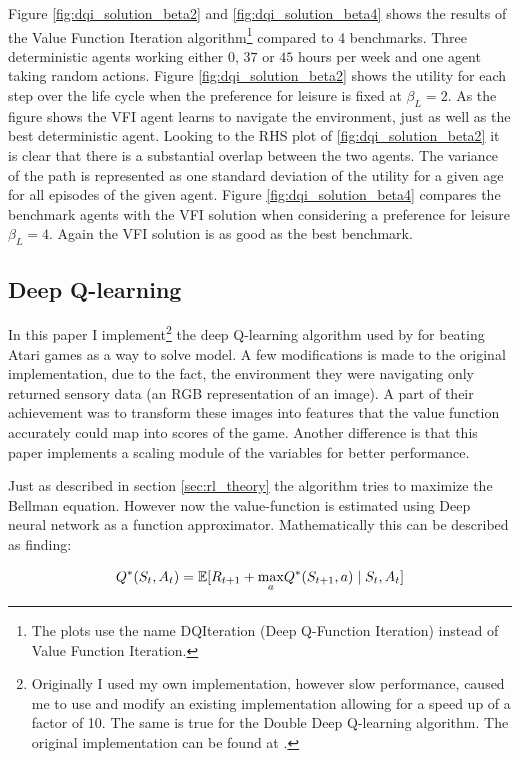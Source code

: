 Figure \ref{fig:dqi_solution_beta2} and \ref{fig:dqi_solution_beta4} shows the results of the Value Function Iteration algorithm\footnote{The plots use the name DQIteration (Deep Q-Function Iteration) instead of Value Function Iteration.} compared to 4 benchmarks. Three deterministic agents working either $0$, $37$ or $45$ hours per week and one agent taking random actions. Figure \ref{fig:dqi_solution_beta2} shows the utility for each step over the life cycle when the preference for leisure is fixed at $\beta_L = 2$. As the figure shows the VFI agent learns to navigate the environment, just as well as the best deterministic agent. Looking to the RHS plot of \ref{fig:dqi_solution_beta2} it is clear that there is a substantial overlap between the two agents. The variance of the path is represented as one standard deviation of the utility for a given age for all episodes of the given agent. Figure \ref{fig:dqi_solution_beta4} compares the benchmark agents with the VFI solution when considering a preference for leisure $\beta_L = 4$. Again the VFI solution is as good as the best benchmark.

\subsection{Deep Q-learning}

In this paper I implement\footnote{Originally I used my own implementation, however slow performance, caused me to use and modify an existing implementation allowing for a speed up of a factor of 10. The same is true for the Double Deep Q-learning algorithm. The original implementation can be found at \textcite{tabor_deep_2020}.} the deep Q-learning algorithm used by \textcite{mnih_playing_2013} for beating Atari games as a way to solve model. A few modifications is made to the original implementation, due to the fact, the environment they were navigating only returned sensory data (an RGB representation of an image).  A part of their achievement was to transform these images into features that the value function accurately could map into scores of the game. Another difference is that this paper implements a scaling module of the variables for better performance.

Just as described in section \ref{sec:rl_theory} the algorithm tries to maximize the Bellman equation. However now the value-function is estimated using Deep neural network as a function approximator. Mathematically this can be described as finding:

\begin{equation}
    Q^*(S_t,A_t) = \mathbb{E} [R_{t+1} + \underset{a}{\max}  Q^*(S_{t+1}, a) \mid S_t, A_t]
\end{equation}

